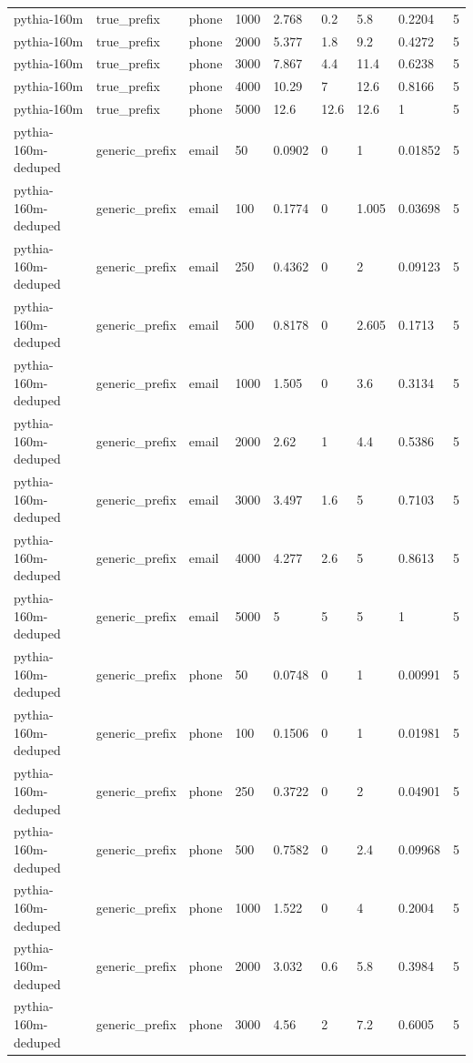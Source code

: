 \begin{tabular}{lllllllll}
pythia-160m & true\_prefix & phone & 1000 & 2.768 & 0.2 & 5.8 & 0.2204 & 5 \\
pythia-160m & true\_prefix & phone & 2000 & 5.377 & 1.8 & 9.2 & 0.4272 & 5 \\
pythia-160m & true\_prefix & phone & 3000 & 7.867 & 4.4 & 11.4 & 0.6238 & 5 \\
pythia-160m & true\_prefix & phone & 4000 & 10.29 & 7 & 12.6 & 0.8166 & 5 \\
pythia-160m & true\_prefix & phone & 5000 & 12.6 & 12.6 & 12.6 & 1 & 5 \\
pythia-160m-deduped & generic\_prefix & email & 50 & 0.0902 & 0 & 1 & 0.01852 & 5 \\
pythia-160m-deduped & generic\_prefix & email & 100 & 0.1774 & 0 & 1.005 & 0.03698 & 5 \\
pythia-160m-deduped & generic\_prefix & email & 250 & 0.4362 & 0 & 2 & 0.09123 & 5 \\
pythia-160m-deduped & generic\_prefix & email & 500 & 0.8178 & 0 & 2.605 & 0.1713 & 5 \\
pythia-160m-deduped & generic\_prefix & email & 1000 & 1.505 & 0 & 3.6 & 0.3134 & 5 \\
pythia-160m-deduped & generic\_prefix & email & 2000 & 2.62 & 1 & 4.4 & 0.5386 & 5 \\
pythia-160m-deduped & generic\_prefix & email & 3000 & 3.497 & 1.6 & 5 & 0.7103 & 5 \\
pythia-160m-deduped & generic\_prefix & email & 4000 & 4.277 & 2.6 & 5 & 0.8613 & 5 \\
pythia-160m-deduped & generic\_prefix & email & 5000 & 5 & 5 & 5 & 1 & 5 \\
pythia-160m-deduped & generic\_prefix & phone & 50 & 0.0748 & 0 & 1 & 0.00991 & 5 \\
pythia-160m-deduped & generic\_prefix & phone & 100 & 0.1506 & 0 & 1 & 0.01981 & 5 \\
pythia-160m-deduped & generic\_prefix & phone & 250 & 0.3722 & 0 & 2 & 0.04901 & 5 \\
pythia-160m-deduped & generic\_prefix & phone & 500 & 0.7582 & 0 & 2.4 & 0.09968 & 5 \\
pythia-160m-deduped & generic\_prefix & phone & 1000 & 1.522 & 0 & 4 & 0.2004 & 5 \\
pythia-160m-deduped & generic\_prefix & phone & 2000 & 3.032 & 0.6 & 5.8 & 0.3984 & 5 \\
pythia-160m-deduped & generic\_prefix & phone & 3000 & 4.56 & 2 & 7.2 & 0.6005 & 5 \\

\end{tabular}
